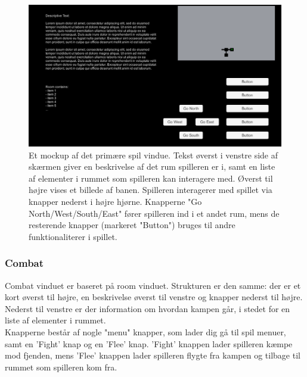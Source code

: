 \begin{figure}[H]
\centering
\includegraphics[width = \textwidth]{02-Body/Images/RoomMockup.PNG}
\caption{Et mockup af det primære spil vindue. Tekst øverst i venstre side af skærmen giver en beskrivelse af det rum spilleren er i, samt en liste af elementer i rummet som spilleren kan interagere med. Øverst til højre vises et billede af banen. Spilleren interagerer med spillet via knapper nederst i højre hjørne. Knapperne "Go {North/West/South/East}" fører spilleren ind i et andet rum, mens de resterende knapper (markeret "Button") bruges til andre funktionaliterer i spillet.}
\label{fig:Design-FE-mockup-room}
\end{figure}

\subsubsection{Combat}

Combat vinduet er baseret på room vinduet. Strukturen er den samme: der er et kort øverst til højre, en beskrivelse øverst til venstre og knapper nederst til højre. Nederst til venstre er der information om hvordan kampen går,  i stedet for en liste af elementer i rummet.\\
Knapperne består af nogle "menu" knapper, som lader dig gå til spil menuer, samt en 'Fight' knap og en 'Flee' knap. 'Fight' knappen lader spilleren kæmpe mod fjenden, mens 'Flee' knappen lader spilleren flygte fra kampen og tilbage til rummet som spilleren kom fra.


